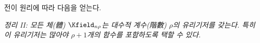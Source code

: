
전이 원리에 따라 다음을 얻는다.

\emph{정리 II: 모든 체(體) $\Kfield_{n\rho}$는 대수적 계수(階數) $\rho$의 유리기저를 갖는다. 특히 이 유리기저는 많아야 $\rho+1$개의 함수를 포함하도록 택할 수 있다.}
